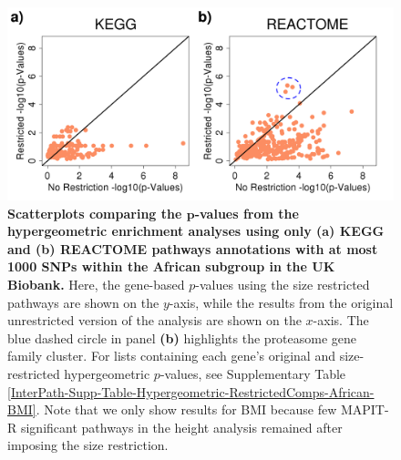 \documentclass[10pt]{article}
\begin{document}
\begin{figure}[htb]
\centering
\includegraphics[width=\textwidth]{Images/Main/InterPath_Main_Figure_Hypergeometric_RestrictedComps_African_BMI_vs4.png}
\caption{\textbf{Scatterplots comparing the $\bm{p}$-values from the hypergeometric enrichment analyses using only (a) KEGG and (b) REACTOME pathways annotations with at most 1000 SNPs within the African subgroup in the UK Biobank.} Here, the gene-based $p$-values using the size restricted pathways are shown on the $y$-axis, while the results from the original unrestricted version of the analysis are shown on the $x$-axis. The blue dashed circle in panel \textbf{(b)} highlights the proteasome gene family cluster. For lists containing each gene's original and size-restricted hypergeometric $p$-values, see Supplementary Table \ref{InterPath-Supp-Table-Hypergeometric-RestrictedComps-African-BMI}. Note that we only show results for BMI because few MAPIT-R significant pathways in the height analysis remained after imposing the size restriction.}
\label{InterPath-Main-Figure-Hypergeometric-RestrictedComps-African-BMI}
\end{figure}

\end{document}
